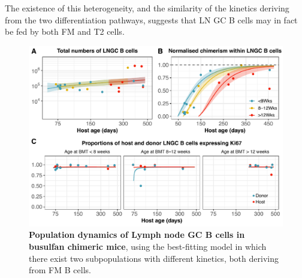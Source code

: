 \documentclass[12pt]{article}
\newcommand{\blue}[1]{{\color{blue}{#1}}}
\begin{document}
The existence of this heterogeneity, and the similarity of the kinetics deriving from the two differentiation pathways, suggests that LN GC B cells may in fact be fed by both FM and T2 cells.


\blue{THIS IS A DETAIL THAT CAN GO IN THE SI. Because we allowed for the possibility that FM B cells were the precursors to GC cells, and FM cells might form a reservoir of YFP+ cells,  the rate of loss of YFP-tagged cells provided lower bounds on the intrinsic rate of loss of each GC population.}

    \begin{figure}[htbp]
    	\centerline{\includegraphics[scale = 0.85] {Results_LNGC_FM.pdf}}
    		\caption{ \textbf{Population dynamics of Lymph node GC B cells in busulfan chimeric mice}, using the best-fitting model in which there exist two subpopulations with different kinetics, both deriving from FM B cells.}
    		\label{fig:results_LNGC}
    \end{figure}


\end{document}
